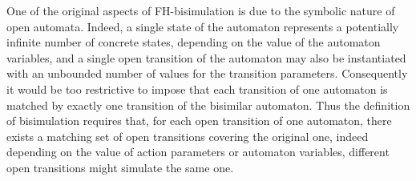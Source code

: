 \documentclass{lmcs}
\begin{document}
One of the original aspects of FH-bisimulation is due to the symbolic nature of open automata. Indeed, a single state of the automaton represents a potentially infinite number of concrete states, depending on the value of the automaton variables, and a single open transition of the automaton may also be instantiated with an unbounded number of values for the transition parameters. Consequently it would be too restrictive to impose that each transition of one automaton is matched by exactly one transition of the bisimilar automaton. Thus the definition of bisimulation requires that, for each open transition of one automaton, there exists a matching  set of open transitions covering the original one, indeed depending on the value of action parameters or automaton variables, different open transitions might simulate the same one.
\end{document}
